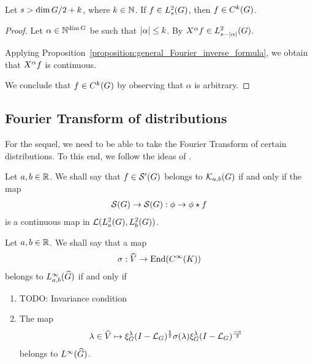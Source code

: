 \begin{corollary}
    Let $s > \dim \Group / 2 + k$, where $k \in \N$.
    If $f \in \Sobolev s$,
    then $f \in \Class k$.
\end{corollary}
\begin{proof}
    Let $\alpha \in \N^{\dim \Group}$ be such that $\abs \alpha \leq k$.
    By %
    $\LeftDifferentialOperator \alpha f \in \Sobolev {s - \abs \alpha}$.

    Applying Proposition~\ref{proposition:general_Fourier_inverse_formula},
    we obtain that $\LeftDifferentialOperator \alpha f$ is continuous.
    
    We conclude that $f \in \Class k$ by observing that $\alpha$ is arbitrary.
\end{proof}

\subsection{Fourier Transform of distributions}

For the sequel, we need to be able to take the Fourier Transform of certain distributions.
To this end, we follow the ideas of \cite{FischerRuzhansky15}.

\begin{definition}
    Let $a, b \in \R$.
    We shall say that $f \in \TemperedDistributions\Group$ belongs to $\KernelsSobolev{a}{b}$ if and only if the map
    \begin{align*}
        \Schwartz\Group \to \Schwartz\Group : \phi \to \conv{\phi}{f}
    \end{align*}
    is a continuous map in $\Lin{\Sobolev{a}, \Sobolev{b}}$.
\end{definition}

\begin{definition}
    Let $a, b \in \R$.
    We shall say that a map
    \begin{align*}
        \sigma : \dualGroup\VectorSpace \to \End(\SmoothFunctions{\CompactGroup})
    \end{align*}
    belongs to $\LebesgueDual[a, b]{\infty}{\Group}$ if and only if
    \begin{enumerate}
        \item TODO: Invariance condition
        \item The map
            \begin{align*}
                \lambda \in \dualGroup\VectorSpace \mapsto
                \Rep\lambda \BesselPotential{b} \sigma(\lambda) \Rep\lambda \BesselPotential{-a}
            \end{align*}
            belongs to $\LebesgueDual{\infty}{\Group}$.
    \end{enumerate}
\end{definition}

